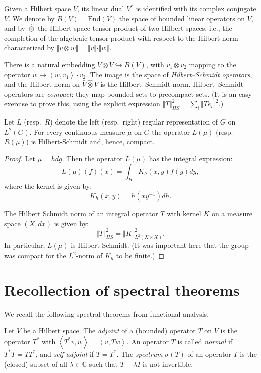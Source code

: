 Given a Hilbert space $V$, its linear dual $V^*$ is identified with its complex conjugate $\bar V$. We denote by $B(V)=\text{End}(V)$ the space of bounded linear operators on $V$, and by $\hat\otimes$ the Hilbert space tensor product of two Hilbert spaces, i.e., the completion of the algebraic tensor product with respect to the Hilbert norm characterized by $\Vert v \otimes w\Vert = \Vert v\Vert\cdot \Vert w \Vert$.

There is a natural embedding $\bar V\hat\otimes V \hookrightarrow B(V)$, with $\bar v_1 \otimes v_2$ mapping 
to the operator 
$ w\mapsto \left<  w, v_1 \right> \cdot v_2$.
The image is the space of {\it Hilbert--Schmidt operators}, and the Hilbert norm on $\bar V\hat\otimes V$ is the Hilbert--Schmidt norm. Hilbert--Schmidt operators are {\it compact}: they map bounded sets to precompact sets. (It is an easy exercise to prove this, using the explicit expression $\Vert T\Vert_{HS}^2 = \sum_i \Vert Te_i\Vert^2$.)


\begin{proposition}
\label{proposition-continuousconvolution-compact}
 Let $L$ (resp.\ $R$) denote the left (resp.\ right) regular representation of $G$ on $L^2(G)$. For every continuous measure $\mu$ on $G$ the operator $L(\mu)$ (resp.\ $R(\mu)$) is Hilbert-Schmidt and, hence, compact.
\end{proposition}

\begin{proof}
 Let $\mu=h dg$. Then the operator $L(\mu)$ has the integral expression:
$$ L(\mu)(f)(x) = \int_{H} K_h(x,y) f(y) dy,$$
where the kernel is given by:
$$ K_h(x,y) = h(xy^{-1}) dh.$$

The Hilbert Schmidt norm of an integral operator $T$ with kernel $K$ on a measure space $(X,dx)$ is given by:
$$ \Vert T\Vert_{HS}^2= \Vert K\Vert^2_{L^2(X\times X)}.$$
In particular, $L(\mu)$ is Hilbert-Schmidt. (It was important here that the group was compact for the $L^2$-norm of $K_h$ to be finite.) 
\end{proof}



\section{Recollection of spectral theorems}
\label{section-recollection-spectraltheorems}

We recall the following spectral theorems from functional analysis. 

Let $V$ be a Hilbert space. The \emph{adjoint} of a (bounded) operator $T$ on $V$ is the operator $T^*$ with $\left<  T^*v,w\right>=\left<  v,Tw\right>$. An operator $T$ is called \emph{normal} if $T^* T = T T^*$, and \emph{self-adjoint} if $T=T^*$. The \emph{spectrum} $\sigma(T)$ of an operator $T$ is the (closed) subset of all $\lambda\in \mathbb C$ such that $T-\lambda I$ is not invertible. 

